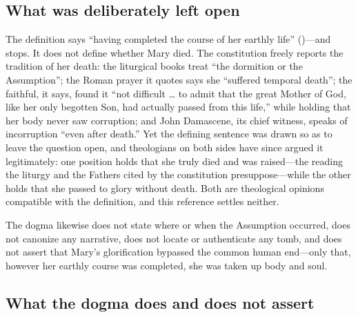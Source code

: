 \subsection*{What was deliberately left open}

The definition says ``having completed the course of her earthly life''
()---and stops. It does not define
whether Mary died. The constitution freely reports the tradition of her
death: the liturgical books treat ``the dormition or the Assumption'';
the Roman prayer it quotes says she ``suffered temporal death''; the
faithful, it says, found it ``not difficult \ldots{} to admit that the
great Mother of God, like her only begotten Son, had actually passed from
this life,'' while holding that her body never saw corruption; and John
Damascene, its chief witness, speaks of incorruption ``even after
death.''
Yet the defining sentence was drawn so as to leave the question open, and
theologians on both sides have since argued it legitimately: one position
holds that she truly died and was raised---the reading the liturgy and the
Fathers cited by the constitution presuppose---while the other holds that
she passed to glory without death. Both are theological opinions
compatible with the definition, and this reference settles neither.

The dogma likewise does not state where or when the Assumption occurred,
does not canonize any  narrative, does not locate or
authenticate any tomb, and does not assert that Mary's glorification
bypassed the common human end---only that, however her earthly course was
completed, she was taken up body and soul.

\subsection*{What the dogma does and does not assert}

